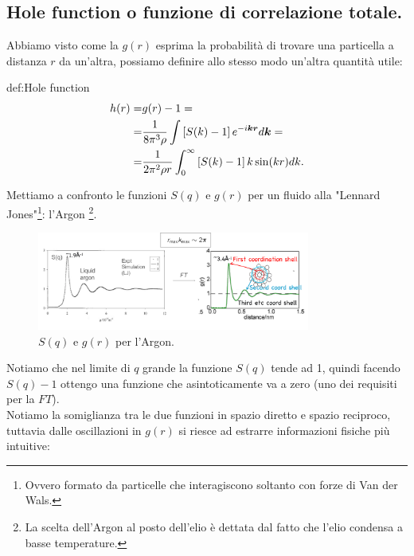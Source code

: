 \subsection{Hole function o funzione di correlazione totale.}
\label{subsec:Hole function}
Abbiamo visto come la $g(r)$ esprima la probabilità di trovare una particella a distanza $r$ da un'altra, possiamo definire allo stesso modo un'altra quantità utile:
\begin{defn}{def:Hole function}
	\[\begin{aligned}
		h(r) 
		=&
		g(r)-1=\\
		=&
		\frac{1}{8\pi^3\rho }\int\left[ S(k)-1 \right]
		e^{-i \boldsymbol{k}\boldsymbol{r}}d \boldsymbol{k} =\\
		=&
		\frac{1}{2\pi^2\rho r}
		\int_{0}^{\infty} \left[ S(k)-1 \right] 
		k\sin(kr)dk
	.\end{aligned}\]
\end{defn}
Mettiamo a confronto le funzioni $S(q)$ e $g(r)$ per un fluido alla "Lennard Jones"\footnote{Ovvero formato da particelle che interagiscono soltanto con forze di Van der Wals.}: l'Argon \footnote{La scelta dell'Argon al posto dell'elio è dettata dal fatto che l'elio condensa a basse temperature.}.
\begin{figure}[H]
	\centering
	\includegraphics[width=0.8\textwidth]{figures/lennard-S.png}
	\caption{$S(q)$ e $g(r)$ per l'Argon.}
	\label{fig:-figures-lennard-S-png}
\end{figure}
Notiamo che nel limite di $q$ grande la funzione $S(q)$ tende ad 1, quindi facendo $S(q)-1$ ottengo una funzione che asintoticamente va a zero (uno dei requisiti per la $FT$).\\
Notiamo la somiglianza tra le due funzioni in spazio diretto e spazio reciproco, tuttavia dalle oscillazioni in $g(r)$ si riesce ad estrarre informazioni fisiche più intuitive:
